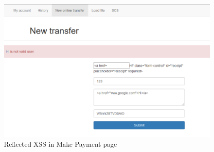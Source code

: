 \begin{figure}[ht]
	\centering
		\includegraphics[width=.8\linewidth]{figures/OTG-INPVAL-001.png}
		\caption{Reflected XSS in Make Payment page}
	\label{fig:OTG-INPVAL-001}
\end{figure}

\clearpage